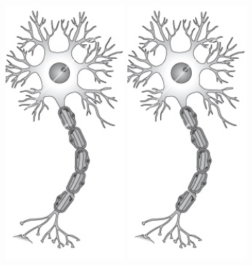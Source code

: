 \documentclass[aspectratio=169]{beamer}
\begin{document}
\begin{frame}
\begin{figure}[ht]
\begin{minipage}[b]{0.23\linewidth}
            \includegraphics[width=0.4\textwidth]{images/InactiveNeuron.jpg}
        \end{minipage}
         \begin{minipage}[b]{0.23\linewidth}
          \includegraphics[width=0.4\textwidth]{images/InactiveNeuron.jpg}
         \end{minipage}
    \end{figure}
\end{frame}
\end{document}
